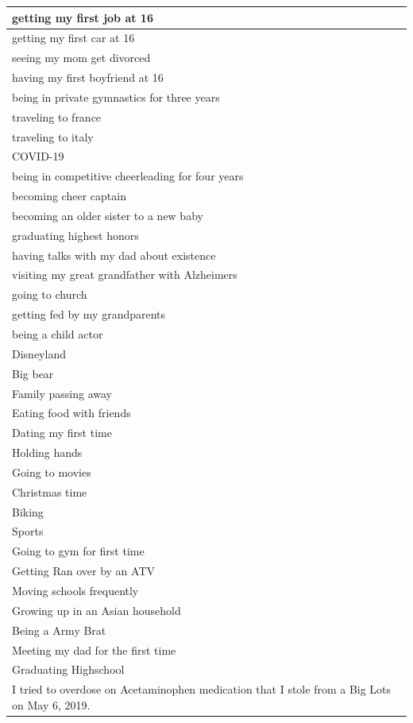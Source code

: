 \documentclass[
  .7em,
  letterpaper,
  DIV=11,
  numbers=noendperiod]{scrartcl}
\begin{document}
\begin{table}
\begin{tabular}{l}
\hline
getting my first job at 16\\
\hline
getting my first car at 16\\
\hline
seeing my mom get divorced\\
\hline
having my first boyfriend at 16\\
\hline
being in private gymnastics for three years\\
\hline
traveling to france\\
\hline
traveling to italy\\
\hline
COVID-19\\
\hline
being in competitive cheerleading for four years\\
\hline
becoming cheer captain\\
\hline
becoming an older sister to a new baby\\
\hline
graduating highest honors\\
\hline
having talks with my dad about existence\\
\hline
visiting my great grandfather with Alzheimers\\
\hline
going to church\\
\hline
getting fed by my grandparents\\
\hline
being a child actor\\
\hline
Disneyland\\
\hline
Big bear\\
\hline
Family passing away\\
\hline
Eating food with friends\\
\hline
Dating my first time\\
\hline
Holding hands\\
\hline
Going to movies\\
\hline
Christmas time\\
\hline
Biking\\
\hline
Sports\\
\hline
Going to gym for first time\\
\hline
Getting Ran over by an ATV\\
\hline
Moving schools frequently\\
\hline
Growing up in an Asian household\\
\hline
Being a Army Brat\\
\hline
Meeting my dad for the first time\\
\hline
Graduating Highschool\\
\hline
I tried to overdose on Acetaminophen medication that I stole from a Big Lots on May 6, 2019.\\

\end{tabular}
\end{table}
\end{document}
